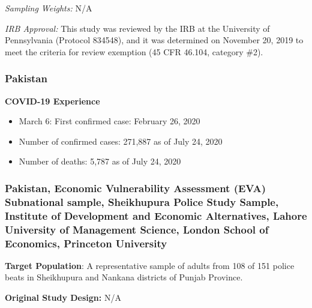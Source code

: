 \documentclass[
  12pt,
]{article}
\begin{document}
\emph{Sampling Weights:} N/A

\emph{IRB Approval:} This study was reviewed by the IRB at the University of Pennsylvania (Protocol 834548), and it was determined on November 20, 2019 to meet the criteria for review exemption (45 CFR 46.104, category \#2).

\hypertarget{pakistan}{%
\subsubsection*{Pakistan}\label{pakistan}}

\textbf{COVID-19 Experience}

\begin{itemize}
\item March 6: First confirmed case: February  26, 2020 
\item Number of confirmed cases:  271,887 as of July 24, 2020 
\item Number of deaths:  5,787 as of July 24, 2020 
\end{itemize}

\hypertarget{pakistan-economic-vulnerability-assessment-eva-subnational-sample-sheikhupura-police-study-sample-institute-of-development-and-economic-alternatives-lahore-university-of-management-science-london-school-of-economics-princeton-university}{%
\subsubsection*{Pakistan, Economic Vulnerability Assessment (EVA) Subnational sample, Sheikhupura Police Study Sample, Institute of Development and Economic Alternatives, Lahore University of Management Science, London School of Economics, Princeton University}\label{pakistan-economic-vulnerability-assessment-eva-subnational-sample-sheikhupura-police-study-sample-institute-of-development-and-economic-alternatives-lahore-university-of-management-science-london-school-of-economics-princeton-university}}

\textbf{Target Population}: A representative sample of adults from 108 of 151 police beats in Sheikhupura and Nankana districts of Punjab Province.

\textbf{Original Study Design:} N/A
\end{document}
